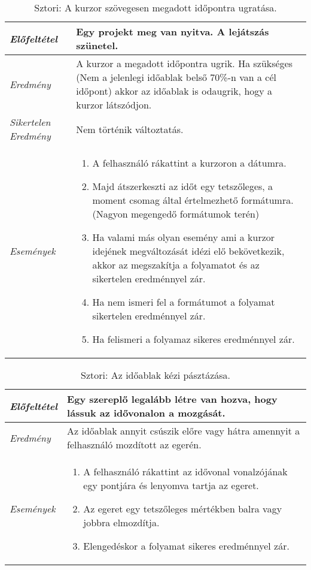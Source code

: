 \begin{table}[H]
	\centering
	\begin{tabular}{ | m{} | m{} | }
		\hline
		\emph{Előfeltétel} & Egy projekt meg van nyitva. A lejátszás szünetel. \\
		\hline
		\emph{Eredmény} & A kurzor a megadott időpontra ugrik. Ha szükséges (Nem a jelenlegi időablak belső 70\%-n van a cél időpont) akkor az időablak is odaugrik, hogy a kurzor látszódjon.  \\
		\hline
		\emph{Sikertelen Eredmény} & Nem történik változtatás.  \\
		\hline
		\hline
		\emph{Események} &
		\begin{enumerate}[itemsep=-1ex]
			\item A felhasználó rákattint a kurzoron a dátumra.
			\item Majd átszerkeszti az időt egy tetszőleges, a moment csomag által értelmezhető formátumra. (Nagyon megengedő formátumok terén)
			\item Ha valami más olyan esemény ami a kurzor idejének megváltozását idézi elő bekövetkezik, akkor az megszakítja a folyamatot és az sikertelen eredménnyel zár.
			\item Ha nem ismeri fel a formátumot a folyamat sikertelen eredménnyel zár.
			\item Ha felismeri a folyamaz sikeres eredménnyel zár.
		\end{enumerate}
		\\
		\hline
	\end{tabular}
	\caption{Sztori: A kurzor szövegesen megadott időpontra ugratása.}
	\label{tab:story-timeline-manual-jump-cursor}
\end{table}

\begin{table}[H]
	\centering
	\begin{tabular}{ | m{} | m{} | }
		\hline
		\emph{Előfeltétel} & Egy szereplő legalább létre van hozva, hogy lássuk az idővonalon a mozgását. \\
		\hline
		\emph{Eredmény} & Az időablak annyit csúszik előre vagy hátra amennyit a felhasználó mozdított az egerén. \\
		\hline
		\hline
		\emph{Események} &
		\begin{enumerate}[itemsep=-1ex]
			\item A felhasználó rákattint az idővonal vonalzójának egy pontjára és lenyomva tartja az egeret.
			\item Az egeret egy tetszőleges mértékben balra vagy jobbra elmozdítja.
			\item Elengedéskor a folyamat sikeres eredménnyel zár.
		\end{enumerate}
		\\
		\hline
	\end{tabular}
	\caption{Sztori: Az időablak kézi pásztázása.}
	\label{tab:story-timeline-manual-pan-timeframe}
\end{table}

